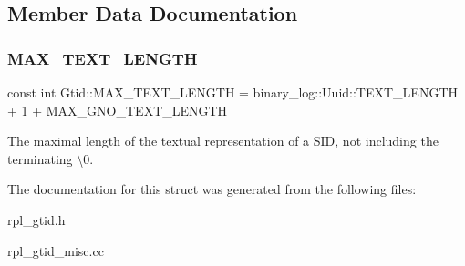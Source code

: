 \subsection{Member Data Documentation}
\mbox{\label{structGtid_a16358c79f9923fb0a0aaab4d71e86fc0}} 
\subsubsection{\texorpdfstring{M\+A\+X\+\_\+\+T\+E\+X\+T\+\_\+\+L\+E\+N\+G\+TH}{MAX\_TEXT\_LENGTH}}
{\footnotesize\ttfamily const int Gtid\+::\+M\+A\+X\+\_\+\+T\+E\+X\+T\+\_\+\+L\+E\+N\+G\+TH = binary\+\_\+log\+::\+Uuid\+::\+T\+E\+X\+T\+\_\+\+L\+E\+N\+G\+TH + 1 + M\+A\+X\+\_\+\+G\+N\+O\+\_\+\+T\+E\+X\+T\+\_\+\+L\+E\+N\+G\+TH\hspace{0.3cm}{\ttfamily [static]}}

The maximal length of the textual representation of a S\+ID, not including the terminating \textquotesingle{}\textbackslash{}0\textquotesingle{}. 

The documentation for this struct was generated from the following files\+:\begin{DoxyCompactItemize}
\item 
rpl\+\_\+gtid.\+h\item 
rpl\+\_\+gtid\+\_\+misc.\+cc\end{DoxyCompactItemize}
